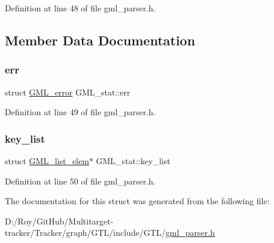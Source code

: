 Definition at line 48 of file gml\+\_\+parser.\+h.



\subsection{Member Data Documentation}
\mbox{\label{struct_g_m_l__stat_afa0e8f9827fda2e60f3a5c7965a464b2}} 
\subsubsection{\texorpdfstring{err}{err}}
{\footnotesize\ttfamily struct \mbox{\hyperlink{struct_g_m_l__error}{G\+M\+L\+\_\+error}} G\+M\+L\+\_\+stat\+::err}



Definition at line 49 of file gml\+\_\+parser.\+h.

\mbox{\label{struct_g_m_l__stat_a3c6317b5ad431531fea5a16bc64490dd}} 
\subsubsection{\texorpdfstring{key\+\_\+list}{key\_list}}
{\footnotesize\ttfamily struct \mbox{\hyperlink{struct_g_m_l__list__elem}{G\+M\+L\+\_\+list\+\_\+elem}}$\ast$ G\+M\+L\+\_\+stat\+::key\+\_\+list}



Definition at line 50 of file gml\+\_\+parser.\+h.



The documentation for this struct was generated from the following file\+:\begin{DoxyCompactItemize}
\item 
D\+:/\+Roy/\+Git\+Hub/\+Multitarget-\/tracker/\+Tracker/graph/\+G\+T\+L/include/\+G\+T\+L/\mbox{\hyperlink{gml__parser_8h}{gml\+\_\+parser.\+h}}\end{DoxyCompactItemize}
